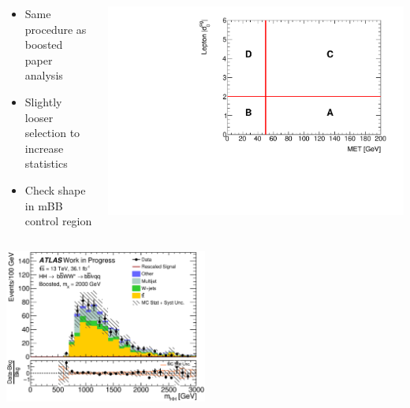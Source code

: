 \documentclass{beamer}
\newcommand*{\header}[1]{\fontsize{16}{8}\selectfont \textbf{{\color{MyPurple}{#1}}}}
\begin{document}
\begin{frame}
\begin{center}
\header{Background Modeling}
\end{center}
\begin{columns}
\begin{column}{0.5\textwidth}
\begin{itemize}
\item Same procedure as boosted paper analysis
\item Slightly looser selection to increase statistics
\item Check shape in mBB control region
\end{itemize}
\end{column}
\begin{column}{0.5\textwidth}
\includegraphics[width=1\textwidth]{figures/ABCD}
\end{column}
\end{columns}
\end{frame}

\begin{frame}
\begin{center}
\header{Background Shape Check}
\end{center}
\begin{center}
\includegraphics[width=0.5\textwidth]{figures/C_2tag_mbbcr_lepton_presel_met50_hhMassRebin1}
\end{center}
\end{frame}
\end{document}
